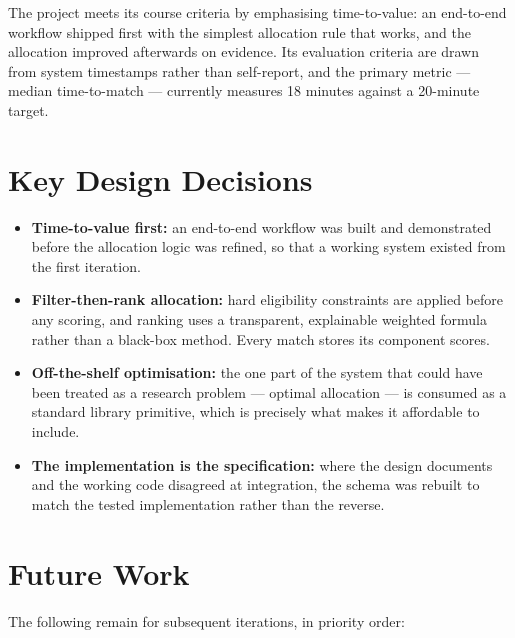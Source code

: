 \documentclass[12pt,a4paper]{report}
\begin{document}
The project meets its course criteria by emphasising time-to-value: an end-to-end workflow shipped first with the simplest allocation rule that works, and the allocation improved afterwards on evidence. Its evaluation criteria are drawn from system timestamps rather than self-report, and the primary metric --- median time-to-match --- currently measures 18 minutes against a 20-minute target.

\section{Key Design Decisions}

\begin{itemize}[leftmargin=*]
    \item \textbf{Time-to-value first:} an end-to-end workflow was built and demonstrated before the allocation logic was refined, so that a working system existed from the first iteration.
    \item \textbf{Filter-then-rank allocation:} hard eligibility constraints are applied before any scoring, and ranking uses a transparent, explainable weighted formula rather than a black-box method. Every match stores its component scores.
    \item \textbf{Off-the-shelf optimisation:} the one part of the system that could have been treated as a research problem --- optimal allocation --- is consumed as a standard library primitive, which is precisely what makes it affordable to include.
    \item \textbf{The implementation is the specification:} where the design documents and the working code disagreed at integration, the schema was rebuilt to match the tested implementation rather than the reverse.
\end{itemize}

\section{Future Work}

The following remain for subsequent iterations, in priority order:
\end{document}
